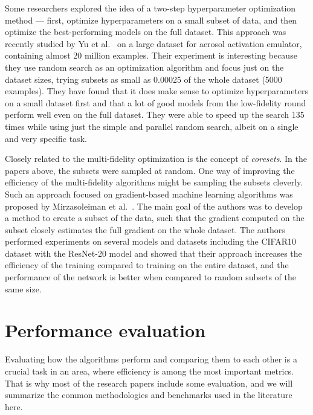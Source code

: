 
Some researchers explored the idea of a two-step hyperparameter optimization method --- first, optimize hyperparameters on a small subset of data, and then optimize the best-performing models on the full dataset. This approach was recently studied by Yu et al.~\cite{yu2024two} on a large dataset for aerosol activation emulator, containing almost 20 million examples. Their experiment is interesting because they use random search as an optimization algorithm and focus just on the dataset sizes, trying subsets as small as 0.00025 of the whole dataset (5000 examples). They have found that it does make sense to optimize hyperparameters on a small dataset first and that a lot of good models from the low-fidelity round perform well even on the full dataset. They were able to speed up the search 135 times while using just the simple and parallel random search, albeit on a single and very specific task.

Closely related to the multi-fidelity optimization is the concept of \textit{coresets}. In the papers above, the subsets were sampled at random. One way of improving the efficiency of the multi-fidelity algorithms might be sampling the subsets cleverly. Such an approach focused on gradient-based machine learning algorithms was proposed by Mirzasoleiman et al.~\cite{mirzasoleiman2020coresets}. The main goal of the authors was to develop a method to create a subset of the data, such that the gradient computed on the subset closely estimates the full gradient on the whole dataset. The authors performed experiments on several models and datasets including the CIFAR10 dataset with the ResNet-20 model and showed that their approach increases the efficiency of the training compared to training on the entire dataset, and the performance of the network is better when compared to random subsets of the same size.

\section{Performance evaluation}
Evaluating how the algorithms perform and comparing them to each other is a crucial task in an area, where efficiency is among the most important metrics. That is why most of the research papers include some evaluation, and we will summarize the common methodologies and benchmarks used in the literature here.

